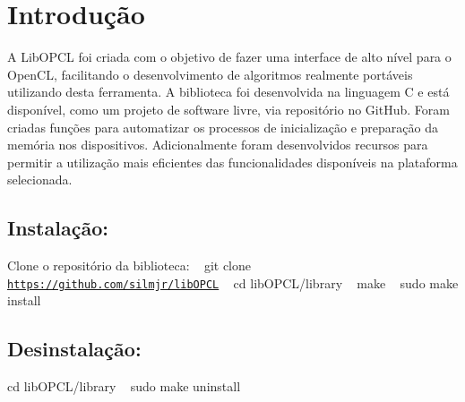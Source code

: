 \hypertarget{index_Introdução}{}\section{Introdução}\label{index_Introdução}
A Lib\+O\+P\+CL foi criada com o objetivo de fazer uma interface de alto nível para o Open\+CL, facilitando o desenvolvimento de algoritmos realmente portáveis utilizando desta ferramenta. A biblioteca foi desenvolvida na linguagem C e está disponível, como um projeto de software livre, via repositório no Git\+Hub. Foram criadas funções para automatizar os processos de inicialização e preparação da memória nos dispositivos. Adicionalmente foram desenvolvidos recursos para permitir a utilização mais eficientes das funcionalidades disponíveis na plataforma selecionada. \hypertarget{index_Install}{}\subsection{Instalação\+:}\label{index_Install}
Clone o repositório da biblioteca\+: ~\newline
 git clone \href{https://github.com/silmjr/libOPCL}{\tt https\+://github.\+com/silmjr/lib\+O\+P\+CL} ~\newline
 cd lib\+O\+P\+C\+L/library ~\newline
 make ~\newline
 sudo make install \hypertarget{index_uninstall}{}\subsection{Desinstalação\+:}\label{index_uninstall}
cd lib\+O\+P\+C\+L/library ~\newline
 sudo make uninstall 